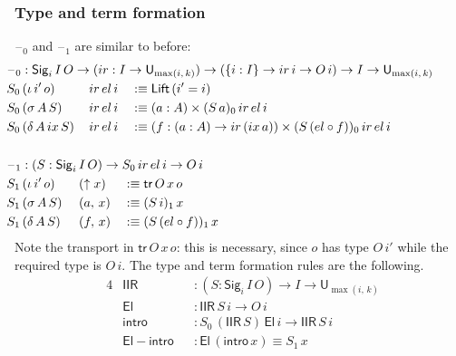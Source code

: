 \documentclass[acmsmall,screen,review,anonymous]{acmart}
\newcommand{\msf}[1]{{\mathsf{#1}}}
\newcommand{\U}{\msf{U}}
\newcommand{\El}{\msf{El}}
\newcommand{\Lift}{\msf{Lift}}
\newcommand{\lup}{\uparrow}
\newcommand{\Sig}{\msf{Sig}}
\newcommand{\blank}{{\mathord{\hspace{1pt}\text{--}\hspace{1pt}}}}
\newcommand{\ir}{{ir}}
\newcommand{\el}{{el}}
\newcommand{\ix}{{ix}}
\newcommand{\intro}{\msf{intro}}
\newcommand{\tr}{\msf{tr}}
\newcommand{\IIR}{\msf{IIR}}
\begin{document}
\subsubsection{Type and term formation}\label{sec:iir-type-and-term-formation}
$\blank_0$ and $\blank_1$ are similar to before:
\begin{alignat*}{4}
  &\hspace{-6em}\rlap{$\blank_0 : \Sig_i\,I\,O \to (\ir : I \to \U_{\max(i,\,k)}) \to (\{i : I\} \to \ir\,i \to O\,i) \to I \to \U_{\max(i,\,k)}$} \\
  &\hspace{-6em}S_0\,(\iota\,i'\,o)     \,&&\ir\,\el\,i && :\equiv \Lift\,(i' = i)\\
  &\hspace{-6em}S_0\,(\sigma\,A\,S)     \,&&\ir\,\el\,i && :\equiv (a : A) \times (S\,a)_0\,\ir\,\el\,i\\
  &\hspace{-6em}S_0\,(\delta\,A\,\ix\,S)\,&&\ir\,\el\,i && :
                     \equiv (f : (a : A) \to \ir\,(\ix\,a)) \times (S\,(\el \circ f))_0\,\ir\,\el\,i\\
  &\hspace{-6em} && &&\\
  &\hspace{-6em}\rlap{$\blank_1 : (S : \Sig_i\,I\,O) \to S_0\,\ir\,\el\,i \to O\,i$} \\
  &\hspace{-6em}S_1\,(\iota\,i'\,o)\,&&\hspace{-0.8em}(\lup x) && \hspace{-0.6em}:\equiv \tr\,O\,x\,o\\
  &\hspace{-6em}S_1\,(\sigma\,A\,S)\,&&\hspace{-0.8em}(a,\,x)  && \hspace{-0.6em}:\equiv (S\,i)_1\,x\\
  &\hspace{-6em}S_1\,(\delta\,A\,S)\,&&\hspace{-0.8em}(f,\,x)  && \hspace{-0.6em}:\equiv (S\,(\el \circ f))_1\,x
\end{alignat*}
Note the transport in $\tr\,O\,x\,o$: this is necessary, since $o$ has type $O\,i'$ while the
required type is $O\,i$. The type and term formation rules are the following.
\begin{alignat*}{4}
  &\IIR               && : (S : \Sig_i\,I\,O) \to I \to \U_{\max(i,\,k)}\\
  &\El                && : \IIR\,S\,i \to O\,i\\
  &\intro             && : S_0\,(\IIR\,S)\,\El\,i \to \IIR\,S\,i\\
  &\msf{El\!\!-\!\!intro} && : \El\,(\intro\,x) \equiv S_1\,x
\end{alignat*}
\end{document}

